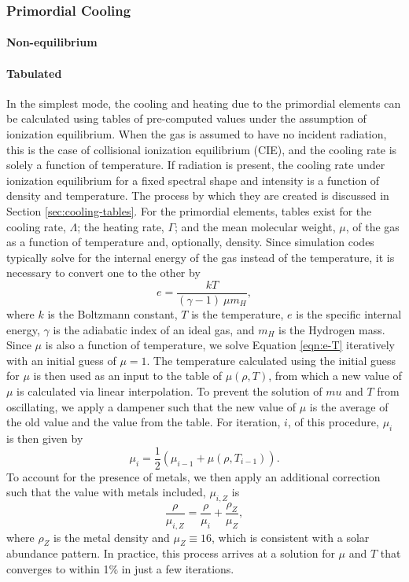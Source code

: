 \subsubsection{Primordial Cooling}

\paragraph{Non-equilibrium} \label{sec:pri-neq}

\paragraph{Tabulated} \label{sec:pri-tab}
In the simplest mode, the cooling and heating due to the primordial
elements can be calculated using tables of pre-computed values under
the assumption of ionization equilibrium.  When the gas is assumed to
have no incident radiation, this is the case of collisional ionization
equilibrium (CIE), and the cooling rate is solely a function of
temperature.  If radiation is present, the cooling rate under
ionization equilibrium for a fixed spectral shape and intensity is a
function of density and temperature.  The process by which they are
created is discussed in Section \ref{sec:cooling-tables}.  For the
primordial elements, tables exist for the cooling rate, $\Lambda$;
the heating rate, $\Gamma$; and the mean molecular weight, $\mu$, of
the gas as a function of temperature and, optionally, density.  Since
simulation codes typically solve for the internal energy of the gas
instead of the temperature, it is necessary to convert one to the
other by
\begin{equation} \label{eqn:e-T}
e = \frac{k T}{(\gamma - 1)\ \mu m_{H}},
\end{equation}
where $k$ is the Boltzmann constant, $T$ is the temperature, $e$ is
the specific internal energy, $\gamma$ is the adiabatic index of an
ideal gas, and $m_{H}$ is the Hydrogen mass.  Since $\mu$ is also a
function of temperature, we solve Equation \ref{eqn:e-T} iteratively
with an initial guess of $\mu = 1$.  The temperature calculated using
the initial guess for $\mu$ is then used as an input to the table of
$\mu(\rho, T)$, from which a new value of $\mu$ is calculated via
linear interpolation.  To prevent the solution of $mu$ and $T$ from
oscillating, we apply a dampener such that the new value of $\mu$ is
the average of the old value and the value from the table.  For
iteration, $i$, of this procedure, $\mu_{i}$ is then given by
\begin{equation}
\mu_{i} = \frac{1}{2} (\mu_{i-1} + \mu(\rho, T_{i-1})).
\end{equation}
To account for the presence of metals, we then apply an additional
correction such that the value with metals included, $\mu_{i, Z}$ is
\begin{equation}
\frac{\rho}{\mu_{i, Z}} = \frac{\rho}{\mu_{i}} +
\frac{\rho_{Z}}{\mu_{Z}},
\end{equation}
where $\rho_{Z}$ is the metal density and $\mu_{Z} \equiv 16$, which
is consistent with a solar abundance pattern.  In practice, this
process arrives at a solution for $\mu$ and $T$ that converges to
within 1\% in just a few iterations.


